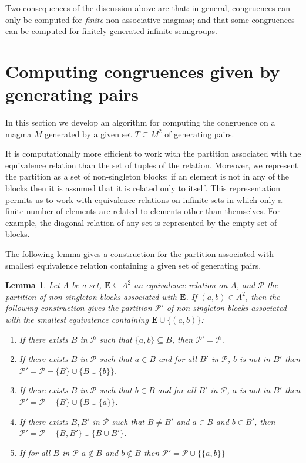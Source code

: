 \documentclass{acmconf}
\newtheorem{lemma}{Lemma}
\begin{document}
Two consequences of the discussion above are that: in general, 
congruences can only be computed for {\em finite} non-associative magmas; 
and that some congruences can be computed for finitely generated infinite
semigroups.

\section{Computing congruences given by generating pairs} \label{s:cong}
In this section we develop an algorithm for computing the
congruence on a magma $M$ generated by a given set $T\subseteq M^2$
of generating pairs.    

It is computationally more efficient to work with the
partition associated with the equivalence relation than
the set of tuples of the relation. 
Moreover, we represent the partition 
as a set of non-singleton blocks;
if an element is not in any of the blocks then it is 
assumed that it is related only to itself. This
representation  permits us to work with equivalence relations
on infinite sets in which only a finite number of elements
are related to elements other than themselves.
For example, the diagonal relation of any set is represented
by the empty set of blocks.

The following lemma gives a construction for the  
partition associated with smallest 
equivalence relation containing a given set of generating pairs.

\begin{lemma} \label{L:a} 
Let A be a set, $\mathbf E\subseteq A^2$ an equivalence relation on $A$,
and $\mathcal P$ the partition of non-singleton blocks associated with 
$\mathbf E$.
If $(a,b)\in A^2$, then
the following construction gives the partition
$\mathcal P'$ of non-singleton blocks
associated with the  
smallest equivalence containing $\mathbf E\cup \{(a,b)\}$:
\begin{enumerate}
\item If there exists $B$ in $\mathcal P$  
      such that $\{a,b\}\subseteq B$, then $\mathcal P'=\mathcal P$.
\item If there exists $B$ in $\mathcal P$ such that
   $a\in B$ and for all $B'$ in $\mathcal P$, $b$ is not in  $B'$ then 
   $\mathcal P'=\mathcal P-\{B\}\cup \{B\cup\{ b\}\}$.
\item If there exists $B$ in $\mathcal P$ such that
   $b\in B$ and for all $B'$ in $\mathcal P$, $a$ is not in  $B'$ then 
   $\mathcal P'=\mathcal P-\{B\}\cup \{B\cup\{ a\}\}$.
\item If there exists $B,B'$ in $\mathcal P$ such that $B\neq B'$ and
   $a\in B$ and $b\in B'$, then $\mathcal P'=\mathcal P-\{B,B'\}\cup \{B\cup B'\}$.
\item If for all $B$ in $\mathcal P$ $a\not\in B$ and $b\not\in B$ then
   $\mathcal P'=\mathcal P\cup \{\{a,b\}\}$ 
\end{enumerate}
\end{lemma}
\end{document}
